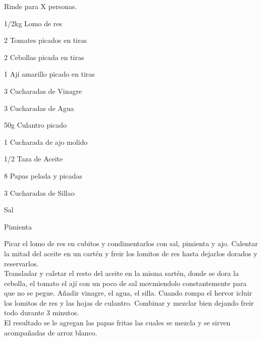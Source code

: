 
Rinde para X personas.\\

\begin{ingredientes}
\item 1/2kg Lomo de res
\item 2 Tomates picados en tiras
\item 2 Cebollas picada en tiras
\item 1 Ají amarillo picado en tiras
\item 3 Cucharadas de Vinagre
\item 3 Cucharadas de Agua
\item 50g Culantro picado
\item 1 Cucharada de ajo molido
\item 1/2 Taza de Aceite
\item 8 Papas pelada y picadas
\item 3 Cucharadas de Sillao
\item Sal
\item Pimienta
\end{ingredientes}
\preparacion
Picar el lomo de res en cubitos y condimentarlos con sal, pimienta y ajo. Calentar la mitad del aceite en un cartén y freir los lomitos de res hasta dejarlos dorados y reservarlos.\\

Transladar y caletar el resto del aceite en la misma sartén, donde se dora la cebolla, el tomato el ají con un poco de sal movmiendolo constantemente para que no se pegue. Añadir vinagre, el agua, el silla. Cuando rompa el hervor icluir los lomitos de res y las hojas de culantro. Combinar y mezclar bien dejando freir todo durante 3 minutos.\\

El resultado se le agregan las papas fritas las cuales se mezcla y se sirven acompañadas de arroz blanco.